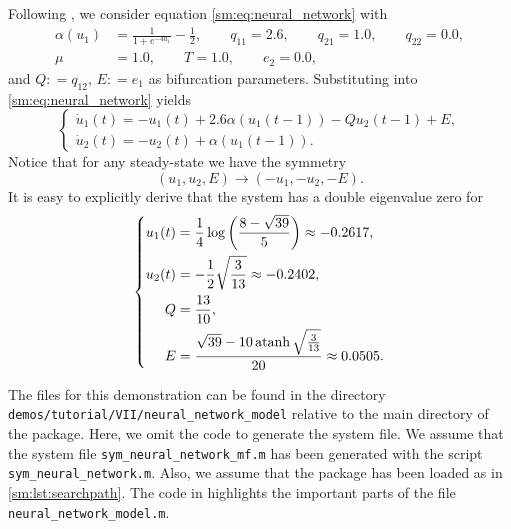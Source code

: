 Following \cite{giannakopoulos2001bifurcations}, we consider equation \cref{sm:eq:neural_network} with
\begin{align*}
\alpha(u_1) & = \frac{1}{1 + e^{-4u_1}}-\frac{1}{2},\qquad q_{11} = 2.6,\qquad q_{21} = 1.0,\qquad q_{22} = 0.0,\\
\mu & = 1.0,\qquad T = 1.0,\qquad e_2 = 0.0,
\end{align*}
and $Q: = q_{12},\,E: = e_1$ as bifurcation parameters. Substituting
into \cref{sm:eq:neural_network} yields
\begin{equation}
\label{sm:eq:neural_network_subs}
\begin{cases}
\dot{u}_1(t) = -u_1(t) + 2.6\alpha(u_1(t - 1))-Qu_2(t - 1) + E,\\
\dot{u}_2(t) = -u_2(t) + \alpha(u_1(t - 1)).
\end{cases}
\end{equation}
Notice that for any steady-state we have the symmetry
\begin{equation}
\label{sm:eq:neuralNetworkSymmetry}
    (u_1,u_2,E)\rightarrow(-u_1,-u_2,-E).
\end{equation}
It is easy to explicitly derive that
the system has a double eigenvalue zero for
\begin{equation}
\left\{
\begin{aligned}
    u_1(t) &= \frac14 \log\left(\frac{8 - \sqrt{39}}5\right) \approx -0.2617, \\
    u_2(t) &= -\frac12 \sqrt{\frac{3}{13}} \approx -0.2402, \\
    Q &= \frac{13}{10}, \\
    E &= \frac{\sqrt{39} - 10\operatorname{atanh} \sqrt{\frac{3}{13}}}{20} \approx 0.0505.
\end{aligned}
\right.
\end{equation}

\begin{remark} 
    The \MATLAB files for this demonstration can be found in the directory
    \texttt{demos/tutorial/VII/neural_network_model} relative to the main
    directory of the \DDEBIFTOOL package. Here, we omit the code to generate the
    system file. We assume that the system file
    \texttt{sym_neural_network_mf.m} has been
    generated with the script \texttt{sym_neural_network.m}. Also, we assume
    that the \DDEBIFTOOL package has been loaded as in
    \cref{sm:lst:searchpath}. The code in
    highlights the important parts of the file
    \texttt{neural_network_model.m}. 
\end{remark}

